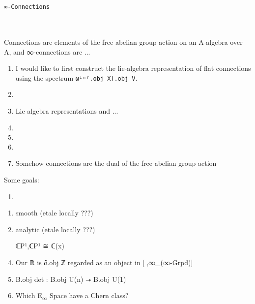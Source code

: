 \documentclass{book}
\theoremstyle{definition}
\renewcommand{\chapter}[1]{
\newpage
{
\Huge 
\begin{center}
\ \\
\ \\
\thispagestyle{empty}
\texttt{#1}
\end{center}}
\ \\
\ \\
}
\begin{document}

\newpage
\chapter{∞-Connections}

Connections are elements of the free abelian group action on an A-algebra over A, and ∞-connections are ...\\

\begin{enumerate}
\item I would like to first construct the lie-algebra representation of flat connections using the spectrum \texttt{ωⁱⁿᶠ.obj X).obj V}.
\item 
\item Lie algebra representations and ...
\item 
\item 
\item 
\item Somehow connections are the dual of the free abelian group action
\end{enumerate}

Some goals:
\begin{enumerate}
\item 
\end{enumerate}

\begin{enumerate}
\item smooth (etale locally ???)
\item analytic (etale locally ???)
\item [ℂP¹,ℂP¹] ≅ ℂ(x)
\item Our ℝ is ∂.obj ℤ regarded as an object in [γ⃗,∞\_(∞-Grpd)]
\item B.obj det : B.obj U(n) ⭢ B.obj U(1)
\item Which E${}_{\infty}$ Space have a Chern class?
\end{enumerate}
\end{document}
